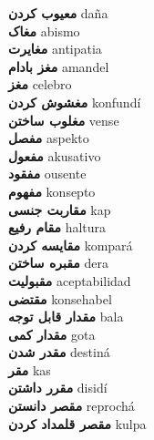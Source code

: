 \textbf{ معیوب کردن  } daña \\
\textbf{ مغاک  } abismo \\
\textbf{ مغایرت  } antipatia \\
\textbf{ مغز بادام  } amandel \\
\textbf{ مغز  } celebro \\
\textbf{ مغشوش کردن  } konfundí \\
\textbf{ مغلوب ساختن  } vense \\
\textbf{ مفصل  } aspekto \\
\textbf{ مفعول  } akusativo \\
\textbf{ مفقود  } ousente \\
\textbf{ مفهوم  } konsepto \\
\textbf{ مقاربت جنسی  } kap \\
\textbf{ مقام رفیع  } haltura \\
\textbf{ مقایسه کردن  } kompará \\
\textbf{ مقبره ساختن  } dera \\
\textbf{ مقبولیت  } aceptabilidad \\
\textbf{ مقتضی  } konsehabel \\
\textbf{ مقدار قابل توجه  } bala \\
\textbf{ مقدار کمی  } gota \\
\textbf{ مقدر شدن  } destiná \\
\textbf{ مقر  } kas \\
\textbf{ مقرر داشتن  } disidí \\
\textbf{ مقصر دانستن  } reprochá \\
\textbf{ مقصر قلمداد کردن  } kulpa \\
